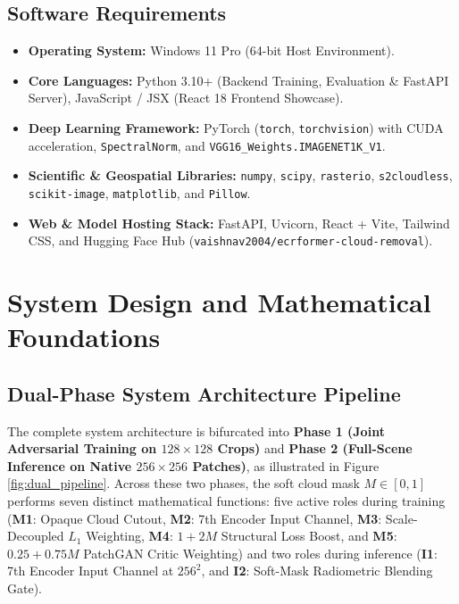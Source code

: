 \documentclass[12pt,a4paper]{report}
\begin{document}
\section{Software Requirements}
\begin{itemize}
    \item \textbf{Operating System:} Windows 11 Pro (64-bit Host Environment).
    \item \textbf{Core Languages:} Python 3.10+ (Backend Training, Evaluation \& FastAPI Server), JavaScript / JSX (React 18 Frontend Showcase).
    \item \textbf{Deep Learning Framework:} PyTorch (\texttt{torch}, \texttt{torchvision}) with CUDA acceleration, \texttt{SpectralNorm}, and \texttt{VGG16\_Weights.IMAGENET1K\_V1}.
    \item \textbf{Scientific \& Geospatial Libraries:} \texttt{numpy}, \texttt{scipy}, \texttt{rasterio}, \texttt{s2cloudless}, \texttt{scikit-image}, \texttt{matplotlib}, and \texttt{Pillow}.
    \item \textbf{Web \& Model Hosting Stack:} FastAPI, Uvicorn, React + Vite, Tailwind CSS, and Hugging Face Hub (\texttt{vaishnav2004/ecrformer-cloud-removal}).
\end{itemize}

\chapter{System Design and Mathematical Foundations}

\section{Dual-Phase System Architecture Pipeline}
The complete system architecture is bifurcated into \textbf{Phase 1 (Joint Adversarial Training on $128\times 128$ Crops)} and \textbf{Phase 2 (Full-Scene Inference on Native $256\times 256$ Patches)}, as illustrated in Figure \ref{fig:dual_pipeline}. Across these two phases, the soft cloud mask $M \in [0, 1]$ performs seven distinct mathematical functions: five active roles during training (\textbf{M1}: Opaque Cloud Cutout, \textbf{M2}: 7th Encoder Input Channel, \textbf{M3}: Scale-Decoupled $L_1$ Weighting, \textbf{M4}: $1+2M$ Structural Loss Boost, and \textbf{M5}: $0.25+0.75M$ PatchGAN Critic Weighting) and two roles during inference (\textbf{I1}: 7th Encoder Input Channel at $256^2$, and \textbf{I2}: Soft-Mask Radiometric Blending Gate).
\end{document}
